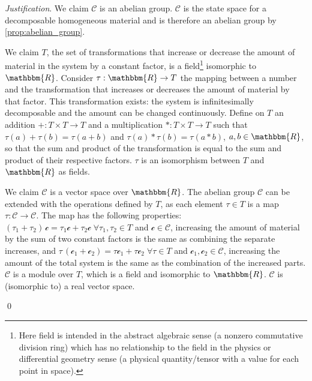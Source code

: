 \documentclass[aps,pra,10pt,twocolumn,floatfix,nofootinbib]{revtex4-1}
\numberwithin{equation}{section}
\theoremstyle{definition}
\newenvironment{justification}{\emph{Justification}.}{\qed}
\begin{document}
\begin{justification}
We claim $\mathcal{C}$ is an abelian group. $\mathcal{C}$ is the state space for a decomposable homogeneous material and is therefore an abelian group  by \ref{prop:abelian_group}.

We claim $T$, the set of transformations that increase or decrease the amount of material in the system by a constant factor, is a field\footnote{Here field is intended in the abstract algebraic sense (a nonzero commutative division ring) which has no relationship to the field in the physics or differential geometry sense (a physical quantity/tensor with a value for each point in space).} isomorphic to $\mathbbm{R}$. Consider $\tau: \mathbbm{R} \rightarrow T$ the mapping between a number and the transformation that increases or decreases the amount of material by that factor. This transformation exists: the system is infinitesimally decomposable and the amount can be changed continuously. Define on $T$ an addition $+: T \times T \rightarrow T$ and a multiplication $*: T \times T \rightarrow T$ such that $\tau(a) + \tau(b) = \tau(a+b)$ and $\tau(a) * \tau(b) = \tau(a*b)$, $a,b \in \mathbbm{R}$, so that the sum and product of the transformation is equal to the sum and product of their respective factors. $\tau$ is an isomorphism between $T$ and $\mathbbm{R}$ as fields.

We claim $\mathcal{C}$ is a vector space over $\mathbbm{R}$. The abelian group $\mathcal{C}$ can be extended with the operations defined by $T$, as each element $\tau \in T$ is a map $\tau : \mathcal{C} \rightarrow \mathcal{C}$. The map has the following properties: $(\tau_1 + \tau_2) \, \mathcal{c} = \tau_1 \mathcal{c} + \tau_2 \mathcal{c} \; \forall \tau_1, \tau_2 \in T$ and $\mathcal{c} \in \mathcal{C}$, increasing the amount of material by the sum of two constant factors is the same as combining the separate increases, and $\tau \, (\mathcal{c}_1 + \mathcal{c}_2) = \tau \mathcal{c}_1 + \tau \mathcal{c}_2\; \forall \tau \in T$ and $\mathcal{c}_1, \mathcal{c}_2 \in \mathcal{C}$, increasing the amount of the total system is the same as the combination of the increased parts. $\mathcal{C}$ is a module over $T$, which is a field and isomorphic to $\mathbbm{R}$. $\mathcal{C}$ is (isomorphic to) a real vector space.


\end{justification}
\end{document}
